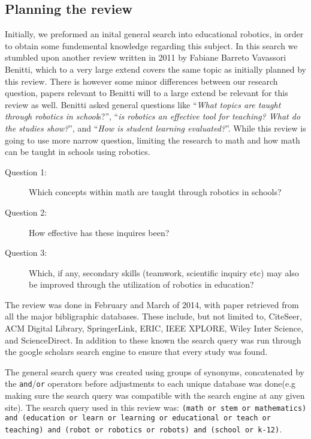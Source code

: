 \subsection{Planning the review}\label{sec:questions}
Initially, we preformed an inital general search into educational robotics, in order to obtain some fundemental knowledge regarding this subject. In this search we stumbled upon another review written in 2011 by Fabiane Barreto Vavassori Benitti\cite{Benitti2012978}, which to a very large extend covers the same topic as initially planned by this review. There is however some minor differences between our research question, papers relevant to Benitti will to a large extend be relevant for this review as well. Benitti asked general questions like "`\textit{What topics are taught through robotics in school}s?"', "`\textit{is robotics an effective tool for teaching? What do the studies show?}"', and "`\textit{How is student learning evaluated?}"'. While this review is going to use more narrow question, limiting the research to math and how math can be taught in schools using robotics.
 
\begin{description}
	\item[Question 1: ] Which concepts within math are taught through robotics in schools?
	\item[Question 2: ] How effective has these inquires been?
	\item[Question 3: ] Which, if any, secondary skills (teamwork, scientific inquiry etc) may also be improved through the utilization of robotics in education?
\end{description}

\bigskip\noindent
The review was done in February and March of 2014, with paper retrieved from all the major bibligraphic databases. These include, but not limited to, CiteSeer, ACM Digital Library, SpringerLink, ERIC, IEEE XPLORE, Wiley Inter Science, and ScienceDirect. In addition to these known the search query was run through the 	google scholars search engine to ensure that every study was found.

\bigskip\noindent
The general search query was created using groups of synonyms, concatenated by the \texttt{and}/\texttt{or} operators before adjustments to each unique database was done(e.g making sure the search query was compatible with the search engine at any given site). The search query used in this review was: \texttt{(math or stem or mathematics) and (education or learn or learning or educational or teach or teaching) and (robot or robotics or robots) and (school or k-12)}. 

